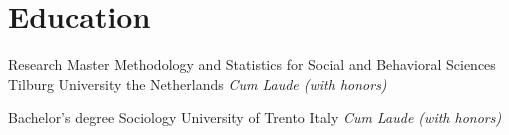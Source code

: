 \section{Education}
            {Research Master}
            {Methodology and Statistics for Social and Behavioral Sciences}
            {Tilburg University}
            {the Netherlands}
            {\emph{Cum Laude (with honors)}}
            {} 
    
    \vspace{10pt}
    
            {Bachelor's degree}
            {Sociology}
            {University of Trento}
            {Italy}
            {\emph{Cum Laude (with honors)}}
            {}